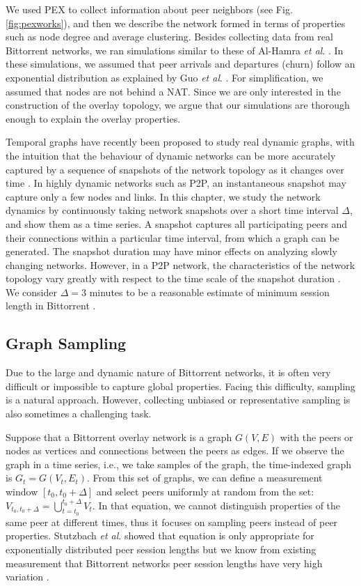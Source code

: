 We used PEX to collect information about peer neighbors (see Fig.\ref{fig:pexworks}), and then we describe the network formed in terms of properties such as node degree and average clustering. 
Besides collecting data from real Bittorrent networks, we ran simulations similar to these of Al-Hamra \textit{et al}. \cite{al2009swarming}. 
In these simulations, we assumed that peer arrivals and departures (churn) follow an exponential distribution as explained by Guo \textit{et al}. \cite{guo2005measurements}. 
For simplification, we assumed that nodes are not behind a NAT.
Since we are only interested in the construction of the overlay topology, we argue that our simulations are thorough enough to explain the overlay properties.

Temporal graphs have recently been proposed to study real dynamic graphs, with the intuition that the behaviour of dynamic networks can be more accurately captured by a sequence of snapshots of the network topology as it changes over time \cite{grindodevolvingnet}\cite{Tang2009}.
In highly dynamic networks such as P2P, an instantaneous snapshot may capture only a few nodes and links. 
In this chapter, we study the network dynamics by continuously taking network snapshots over a short time interval $\Delta$, and show them as a time series.
A snapshot captures all participating peers and their connections within a particular time interval, from which a graph can be generated.
The snapshot duration may have minor effects on analyzing slowly changing networks.
However, in a P2P network, the characteristics of the network topology vary greatly with respect to the time scale of the snapshot duration \cite{stutzbach2008characterizing}.
We consider $\Delta=3 $ minutes to be a reasonable estimate of minimum session length in Bittorrent \cite{stutzbach2006understanding}. 

\subsection{Graph Sampling}\label{sec:graphsampling}
Due to the large and dynamic nature of Bittorrent networks, it is often very difficult or impossible to capture global properties. 
Facing this difficulty, sampling is a natural approach.
However, collecting unbiased or representative sampling is also sometimes a challenging task.

Suppose that a Bittorrent overlay network is a graph $G(V,E)$ with the peers or nodes as vertices and connections between the peers as edges. 
If we observe the graph in a time series,  i.e., we take samples of the graph, the time-indexed graph is $G_t = G(V_t,E_t)$.   
From this set of graphs, we can define a measurement window $[t_0,t_0 + \Delta]$ and select peers uniformly at random from the set: $V_{t_0,t_0+\Delta}=\bigcup^{t_0+\Delta}_{t=t_0} V_t$.
In that equation, we cannot distinguish properties of the same peer at different times, thus it focuses on sampling peers instead of peer properties. 
Stutzbach \textit{et al}. \cite{stutzbach2007sampling} showed that equation is only appropriate for exponentially distributed  peer session lengths but we know from existing measurement that Bittorrent networks peer session lengths have very high variation \cite{guo2005measurements}. 

